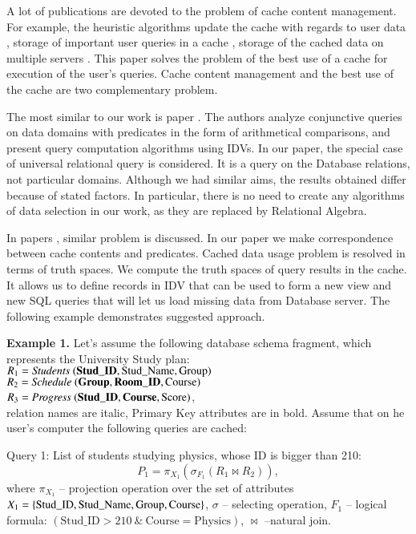 \documentclass[preprint,12pt]{elsarticle}
\begin{document}
A lot of publications are devoted to the problem of cache content management.
For example, the heuristic algorithms update the cache with regards to user data
\cite{chang}, storage of important user queries in a cache
\cite{baralis}, storage of the cached data on multiple servers \cite{kalnis}.
This paper solves the problem of the best use of a cache for execution of the
user's queries. Cache content management and the best use of the cache are two
complementary problem.

The most similar to our work is paper \cite{Afrati06}. The authors analyze
conjunctive queries on data domains with predicates in the form of arithmetical
comparisons, and present query computation algorithms using IDVs. In our paper,
the special case of universal relational query is considered. It is a query on
the Database relations, not particular domains. Although we had similar aims,
the results obtained differ because of stated factors. In particular, there is
no need to create any algorithms of data selection in our work, as they are
replaced by Relational Algebra.

In papers \cite{Keller96}, \cite{shim} similar problem is discussed. In our paper we
make correspondence between cache contents and predicates. Cached data usage
problem is resolved in terms of truth spaces. We compute the truth spaces of
query results in the cache. It allows us to define records in IDV that can be
used to form a new view and new SQL queries that will let us load missing data
from Database server. The following example demonstrates suggested approach.

{\bf Example 1.} Let's assume the following database schema fragment, which
represents the University Study plan:\\
$R_1 =\mbox{\it Students}\ (\mbox{\bf Stud\_ID}, \mbox{Stud\_Name},
\mbox{Group})$\\
$R_2 =\mbox{\it Schedule}\ (\mbox{\bf Group}, \mbox{\bf Room\_ID},
\mbox{Course})$\\
$R_3 =\mbox{\it Progress}\ (\mbox{\bf Stud\_ID}, \mbox{\bf Course},
\mbox{Score})$,\\
relation names are italic, Primary Key attributes are in bold. Assume that on 
he user's computer the following queries are cached:

Query 1: List of students studying physics, whose ID is bigger than 210:
$$P_1 = \pi_{X_1}(\sigma_{F_1} (R_1 \Join R_2)),$$
where $\pi_{X_1}$ -- projection operation over the set of attributes
$X_1 = \{\text{Stud\_ID},\\
\text{Stud\_Name}, \text{Group}, \text{Course}\}$,
$\sigma$ -- selecting operation,
$F_1$ -- logical formula: $(\text{Stud\_ID} > 210\ \&\ \text{Course} =
\text{Physics})$, $\Join$ --natural join.
\end{document}
